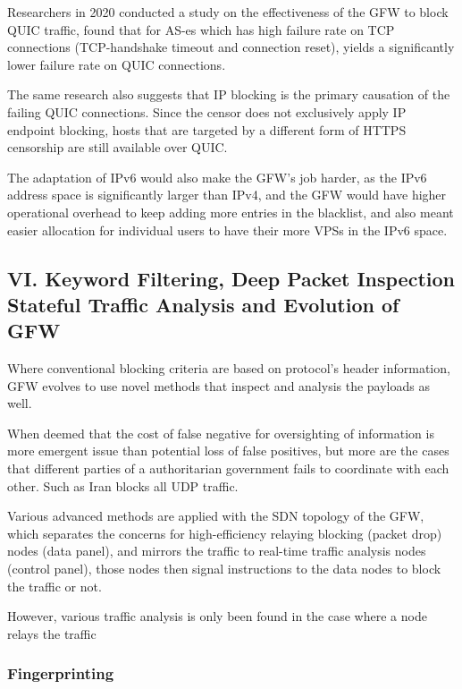 \documentclass[sigconf]{acmart}
\begin{document}
Researchers in 2020 conducted a study on the effectiveness of the GFW to
block QUIC traffic, found that for AS-es which has high failure rate on
TCP connections (TCP-handshake timeout and connection reset), yields a
significantly lower failure rate on QUIC connections.
\cite{53_quicBlock}

The same research also suggests that IP blocking is the primary
causation of the failing QUIC connections. Since the censor does not
exclusively apply IP endpoint blocking, hosts that are targeted by a
different form of HTTPS censorship are still available over QUIC.

The adaptation of IPv6 would also make the GFW's job harder, as the IPv6
address space is significantly larger than IPv4, and the GFW would have
higher operational overhead to keep adding more entries in the
blacklist, and also meant easier allocation for individual users to have
their more VPSs in the IPv6 space.

\hypertarget{vi.-keyword-filtering-deep-packet-inspection-stateful-traffic-analysis-and-evolution-of-gfw}{%
\subsection{VI. Keyword Filtering, Deep Packet Inspection Stateful
Traffic Analysis and Evolution of
GFW}\label{vi.-keyword-filtering-deep-packet-inspection-stateful-traffic-analysis-and-evolution-of-gfw}}

Where conventional blocking criteria are based on protocol's header
information, GFW evolves to use novel methods that inspect and analysis
the payloads as well.

When deemed that the cost of false negative for oversighting of
information is more emergent issue than potential loss of false
positives, but more are the cases that different parties of a
authoritarian government fails to coordinate with each other. Such as
Iran blocks all UDP traffic. \cite{53_quicBlock}

Various advanced methods are applied with the SDN topology of the GFW,
which separates the concerns for high-efficiency relaying blocking
(packet drop) nodes (data panel), and mirrors the traffic to real-time
traffic analysis nodes (control panel), those nodes then signal
instructions to the data nodes to block the traffic or not.

However, various traffic analysis is only been found in the case where a
node relays the traffic

\hypertarget{fingerprinting}{%
\subsubsection{Fingerprinting}\label{fingerprinting}}
\end{document}
